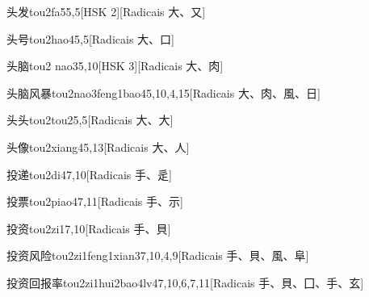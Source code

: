 \begin{entry}{头发}{tou2fa5}{5,5}[HSK 2][Radicais ⼤、⼜]
\end{entry}

\begin{entry}{头号}{tou2hao4}{5,5}[Radicais ⼤、⼝]
\end{entry}

\begin{entry}{头脑}{tou2 nao3}{5,10}[HSK 3][Radicais ⼤、⾁]
\end{entry}

\begin{entry}{头脑风暴}{tou2nao3feng1bao4}{5,10,4,15}[Radicais ⼤、⾁、⾵、⽇]
\end{entry}

\begin{entry}{头头}{tou2tou2}{5,5}[Radicais ⼤、⼤]
\end{entry}

\begin{entry}{头像}{tou2xiang4}{5,13}[Radicais ⼤、⼈]
\end{entry}

\begin{entry}{投递}{tou2di4}{7,10}[Radicais ⼿、⾡]
\end{entry}

\begin{entry}{投票}{tou2piao4}{7,11}[Radicais ⼿、⽰]
\end{entry}

\begin{entry}{投资}{tou2zi1}{7,10}[Radicais ⼿、⾙]
\end{entry}

\begin{entry}{投资风险}{tou2zi1feng1xian3}{7,10,4,9}[Radicais ⼿、⾙、⾵、⾩]
\end{entry}

\begin{entry}{投资回报率}{tou2zi1hui2bao4lv4}{7,10,6,7,11}[Radicais ⼿、⾙、⼞、⼿、⽞]
\end{entry}

